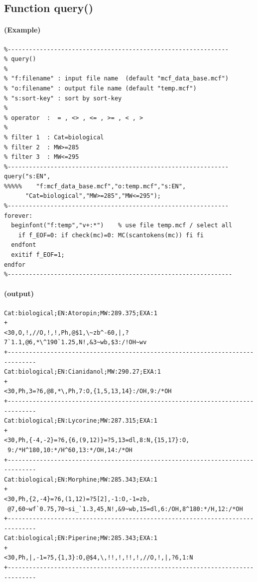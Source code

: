 \documentclass[a4paper]{article}
\begin{document}
\subsection{Function query()}
%
\paragraph{(Example)}
\begin{verbatim}
%--------------------------------------------------------------
% query()
%
% "f:filename" : input file name  (default "mcf_data_base.mcf")
% "o:filename" : output file name (default "temp.mcf")
% "s:sort-key" : sort by sort-key 
%
% operator  :  = , <> , <= , >= , < , >
%
% filter 1  : Cat=biological
% filter 2  : MW>=285
% filter 3  : MW<=295
%--------------------------------------------------------------
query("s:EN",
%%%%%    "f:mcf_data_base.mcf","o:temp.mcf","s:EN",
      "Cat=biological","MW>=285","MW<=295");
%--------------------------------------------------------------
forever:
  beginfont("f:temp","v+:*")    % use file temp.mcf / select all
    if f_EOF=0: if check(mc)=0: MC(scantokens(mc)) fi fi
  endfont
  exitif f_EOF=1;
endfor
%---------------------------------------------------------------
\end{verbatim}
\paragraph{(output)}
\begin{verbatim}
Cat:biological;EN:Atoropin;MW:289.375;EXA:1
+
<30,O,!,//O,!,!,Ph,@$1,\~zb^-60,|,?7`1.1,@6,*\^190`1.25,N!,&3~wb,$3:/!OH~wv 
+------------------------------------------------------------------------------
Cat:biological;EN:Cianidanol;MW:290.27;EXA:1
+
<30,Ph,3=?6,@8,*\,Ph,7:O,{1,5,13,14}:/OH,9:/*OH
+------------------------------------------------------------------------------
Cat:biological;EN:Lycorine;MW:287.315;EXA:1
+
<30,Ph,{-4,-2}=?6,{6,(9,12)}=?5,13=dl,8:N,{15,17}:O,
 9:/*H^180,10:*/H^60,13:*/OH,14:/*OH
+------------------------------------------------------------------------------
Cat:biological;EN:Morphine;MW:285.343;EXA:1
+
<30,Ph,{2,-4}=?6,(1,12)=?5[2],-1:O,-1=zb,
 @7,60~wf`0.75,70~si_`1.3,45,N!,&9~wb,15=dl,6:/OH,8^180:*/H,12:/*OH
+------------------------------------------------------------------------------
Cat:biological;EN:Piperine;MW:285.343;EXA:1
+
<30,Ph,|,-1=?5,{1,3}:O,@$4,\,!!,!,!!,!,//O,!,|,?6,1:N
+------------------------------------------------------------------------------
\end{verbatim}
\noindent%
\newpage
\end{document}
